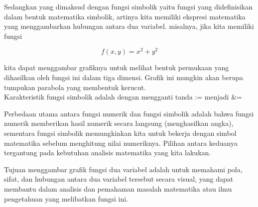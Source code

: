 \documentclass[a4paper,10pt]{article}
\begin{document}
\begin{eulernotebook}
\begin{eulercomment}
\begin{eulercomment}
\begin{eulercomment}
Sedangkan yang dimaksud dengan fungsi simbolik yaitu fungsi yang
didefinisikan dalam bentuk matematika simbolik, artinya kita memiliki
ekspresi matematika yang menggambarkan hubungan antara dua variabel.
misalnya, jika kita memiliki fungsi\\
\end{eulercomment}
\begin{eulerformula}
\[
f(x, y) = x^2 + y^2
\]
\end{eulerformula}
\begin{eulercomment}
kita dapat menggambar grafiknya untuk melihat bentuk permukaan yang
dihasilkan oleh fungsi ini dalam tiga dimensi. Grafik ini mungkin akan
berupa tumpukan parabola yang membentuk kerucut.\\
Karakteristik fungsi simbolik adalah dengan mengganti tanda := menjadi
\&=

Perbedaan utama antara fungsi numerik dan fungsi simbolik adalah bahwa
fungsi numerik memberikan hasil numerik secara langsung (menghasilkan
angka), sementara fungsi simbolik memungkinkan kita untuk bekerja
dengan simbol matematika sebelum menghitung nilai numeriknya. Pilihan
antara keduanya tergantung pada kebutuhan analisis matematika yang
kita lakukan.

Tujuan menggambar grafik fungsi dua variabel adalah untuk memahami
pola, sifat, dan hubungan antara dua variabel tersebut secara visual,
yang dapat membantu dalam analisis dan pemahaman masalah matematika
atau ilmu pengetahuan yang melibatkan fungsi ini.


\end{eulercomment}
\end{eulercomment}
\end{eulercomment}
\end{eulernotebook}
\end{document}
